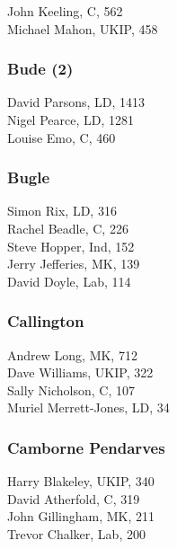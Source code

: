 \documentclass[a4paper,openany,10pt]{book}
\begin{document}


John Keeling, C, 562\\
Michael Mahon, UKIP, 458\\


\subsubsection*{Bude (2)}



David Parsons, LD, 1413\\
Nigel Pearce, LD, 1281\\
Louise Emo, C, 460\\


\subsubsection*{Bugle}



Simon Rix, LD, 316\\
Rachel Beadle, C, 226\\
Steve Hopper, Ind, 152\\
Jerry Jefferies, MK, 139\\
David Doyle, Lab, 114\\


\subsubsection*{Callington}



Andrew Long, MK, 712\\
Dave Williams, UKIP, 322\\
Sally Nicholson, C, 107\\
Muriel Merrett-Jones, LD, 34\\


\subsubsection*{Camborne Pendarves}



Harry Blakeley, UKIP, 340\\
David Atherfold, C, 319\\
John Gillingham, MK, 211\\
Trevor Chalker, Lab, 200\\
\end{document}
